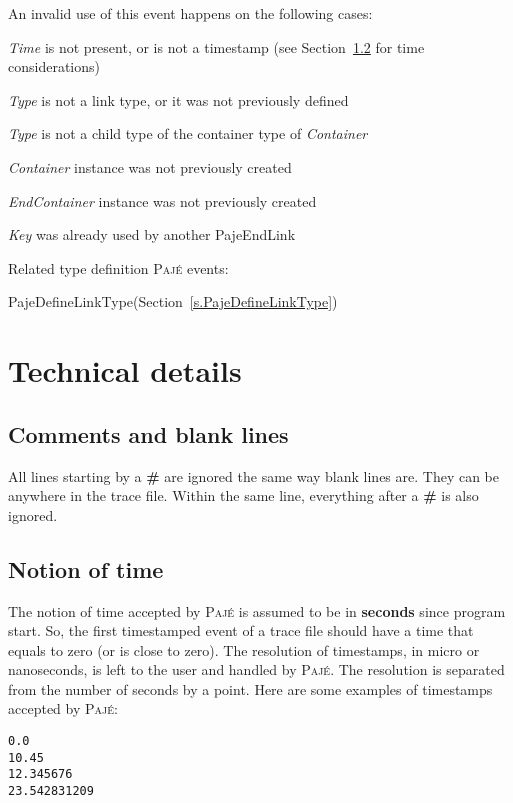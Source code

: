 \documentclass[12pt]{article}
\newcommand{\Paje}{\textsc{Paj\'e}\xspace}
\newcommand{\PajeField}[1]{\emph{#1}\xspace}
\newcommand{\Time}{\PajeField{Time}}
\newcommand{\Type}{\PajeField{Type}}
\newcommand{\Container}{\PajeField{Container}}
\newcommand{\EndContainer}{\PajeField{EndContainer}}
\newcommand{\Key}{\PajeField{Key}}
\newcommand{\PajeEvent}[1]{\textsf{#1}\xspace}
\newcommand{\PajeDefineLinkType}{\PajeEvent{PajeDefineLinkType}}
\newcommand{\PajeEndLink}{\PajeEvent{PajeEndLink}}
\newenvironment{itemize*}%
               {\vspace{-1em}
                 \begin{itemize}%
                   \setlength{\itemsep}{0pt}%
                   \setlength{\parskip}{0pt}}%
               {\end{itemize}}
\begin{document}
An invalid use of this event happens on the following cases:
\begin{itemize*}
\item \Time is not present, or is not a timestamp (see Section~\ref{s.NotionOfTime} for time considerations)
\item \Type is not a link type, or it was not previously defined
\item \Type is not a child type of the container type of \Container
\item \Container instance was not previously created
\item \EndContainer instance was not previously created
\item \Key was already used by another \PajeEndLink
\end{itemize*}

Related type definition \Paje events:
\begin{itemize*}
\item \PajeDefineLinkType (Section~\ref{s.PajeDefineLinkType})
\end{itemize*}

\section{Technical details}
\label{s.Technical}

\subsection{Comments and blank lines}

All lines starting by a {\bf \#} are ignored the same way blank lines
are. They can be anywhere in the trace file. Within the same line,
everything after a {\bf \#} is also ignored.

\subsection{Notion of time}
\label{s.NotionOfTime}

The notion of time accepted by \Paje is assumed to be in {\bf seconds}
since program start. So, the first timestamped event of a trace file
should have a time that equals to zero (or is close to zero). The
resolution of timestamps, in micro or nanoseconds, is left to the user
and handled by \Paje. The resolution is separated from the number of
seconds by a point.  Here are some examples of timestamps accepted by
\Paje:

\begin{verbatim}
0.0
10.45
12.345676
23.542831209
\end{verbatim}
\end{document}
